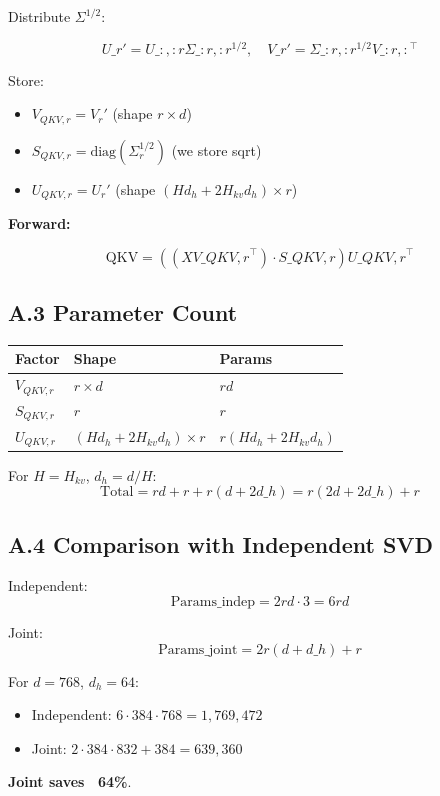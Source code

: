 Distribute $\Sigma^{1/2}$:

\[
U\_r' = U\_{:, :r} \Sigma\_{:r, :r}^{1/2}, \quad
V\_r' = \Sigma\_{:r, :r}^{1/2} V\_{:r, :}^\top
\]

Store:
\begin{itemize}
\item $V_{QKV, r} = V_r'$ (shape $r \times d$)
\item $S_{QKV, r} = \text{diag}(\Sigma_r^{1/2})$ (we store sqrt)
\item $U_{QKV, r} = U_r'$ (shape $(H d_h + 2 H_{kv} d_h) \times r$)

\end{itemize}
\textbf{Forward:}

\[
\text{QKV} = \left((X V\_{QKV, r}^\top) \cdot S\_{QKV, r}\right) U\_{QKV, r}^\top
\]

\subsection{A.3 Parameter Count}

\begin{table}[H]
\centering
\small
\begin{tabular}{lll}
\toprule
\textbf{Factor} & \textbf{Shape} & \textbf{Params} \\
\midrule
$V_{QKV, r}$ & $r \times d$ & $r d$ \\
$S_{QKV, r}$ & $r$ & $r$ \\
$U_{QKV, r}$ & $(H d_h + 2 H_{kv} d_h) \times r$ & $r (H d_h + 2 H_{kv} d_h)$ \\
\bottomrule
\end{tabular}
\end{table}

For $H = H_{kv}$, $d_h = d/H$:
\[
\text{Total} = r d + r + r (d + 2 d\_h) = r(2d + 2 d\_h) + r
\]

\subsection{A.4 Comparison with Independent SVD}

Independent:
\[
\text{Params}\_\text{indep} = 2 r d \cdot 3 = 6 r d
\]

Joint:
\[
\text{Params}\_\text{joint} = 2 r (d + d\_h) + r
\]

For $d = 768$, $d_h = 64$:
\begin{itemize}
\item Independent: $6 \cdot 384 \cdot 768 = 1,769,472$
\item Joint: $2 \cdot 384 \cdot 832 + 384 = 639,360$

\end{itemize}
\textbf{Joint saves ~64\%}.

